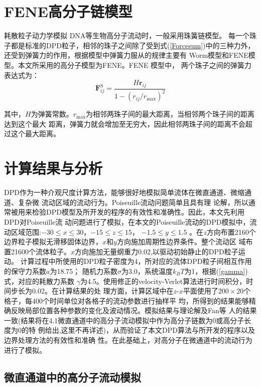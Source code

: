 \documentclass[twoside,12pt]{article}
\begin{document}
\section{ FENE高分子链模型}

耗散粒子动力学模拟 DNA等生物高分子流动时，一般采用珠簧链模型。
每一个珠子都是标准的DPD粒子，相邻的珠子之间除了受到式(\ref{Forcesum})中的三种力外，还受到弹簧力的作用，根据模型中弹簧力服从的规律主要有
Worm模型和FENE模型。本文所采用的高分子模型为FENE。FENE 模型中，
两个珠子之间的弹簧力表达式为：
\begin{equation}
\mathbf{F}_{ij}^{\mathrm{S}} = \frac{H \mathbf{r}_{ij}}{1-(r_{ij}/r_{\mathrm{max}})^2}
\end{equation}

其中，$H$为弹簧常数。$r_{\mathrm{max}}$为相邻两珠子间的最大距离，当相邻两个珠子间的距离达到这个最大
距离，弹簧力就会增加至无穷大，因此相邻两珠子间的距离不会超过这个最大距离。




\section{ 计算结果与分析}

DPD作为一种介观尺度计算方法，能够很好地模拟简单流体在微直通道、微缩通道、复杂微
流动区域的流动行为\cite{Fan_X, MBLiu2007wrr}。Poiseuille流动问题简单且具有理
论解\cite{GRLiu}，所以通
常被用来检验DPD模型及所开发的程序的有效性和准确性。因此，本文先利用DPD对Poiseuille流
动问题进行了模拟，在本文的Poiseuille流动的DPD模拟中，流动区域范围:$-30\leq x \leq 30$，$-15\leq z \leq 15$， $-1.5 \leq y \leq 1.5$ 。在$z$方向布置2160个边界粒子模拟无滑移固体边界，$x$和$y$方向施加周期性边界条件。整个流动区
域布置21600个流体粒子。$x$方向施加无量纲重力0.02,以驱动初始静止的DPD粒子运动。
计算过程中所使用的DPD粒子密度为4，所对应的流体DPD粒子间相互作用的保守力系数$a$为18.75；
随机力系数$\sigma$为3.0，系统温度$k_BT$为1，根据(\ref{gamma})式，对应的耗散力系数 $\gamma$为4.5。使用修正的velocity-Verlet算法\cite{MBLiu2006}进行时间积分，时间步长为0.02。在计算结果的处
理方面，计算区域中在$z$-$x$平面使用了$200\times 20$个格子，每400个时间单位对各格子的流动参数进行抽样平
均，所得到的结果能够精确反映局部位置各种参数的变化及波动情况。模拟结果与理论解及Fan\cite{Fan_X}等
人的结果一致(结果将在4.1微直通道中的高分子流动模拟中作为高分子链数为0或高分子长度为0的特
例给出,这里不再详述)，从而验证了本文DPD算法与所开发的程序以及边界处理方法的有效性和准确
性。在此基础上，对高分子在微通道中的流动行为进行了模拟。

\subsection{ 微直通道中的高分子流动模拟}
\end{document}
